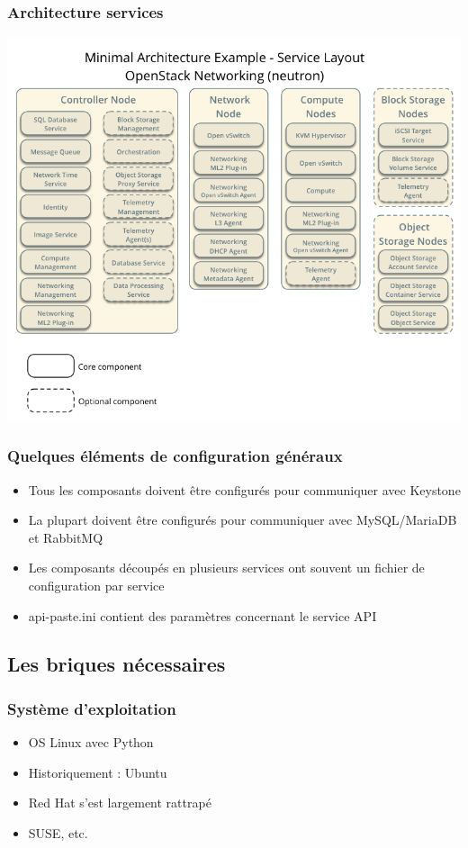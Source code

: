   \begin{frame}
    \frametitle{Architecture services}
    \begin{center}
      \includegraphics[width=\textwidth]{images/archi-service.png}
    \end{center}
  \end{frame}

  \begin{frame}
    \frametitle{Quelques éléments de configuration généraux}
    \begin{itemize}
      \item Tous les composants doivent être configurés pour communiquer avec Keystone
      \item La plupart doivent être configurés pour communiquer avec MySQL/MariaDB et RabbitMQ
      \item Les composants découpés en plusieurs services ont souvent un fichier de configuration par service
      \item api-paste.ini contient des paramètres concernant le service API
    \end{itemize}
  \end{frame}

  \subsection[Les briques nécessaires]{Les briques nécessaires}
  \begin{frame}
    \frametitle{Système d'exploitation}
    \begin{itemize}
      \item OS Linux avec Python
      \item Historiquement : Ubuntu
      \item Red Hat s'est largement rattrapé
      \item SUSE, etc.
    \end{itemize}
  \end{frame}

